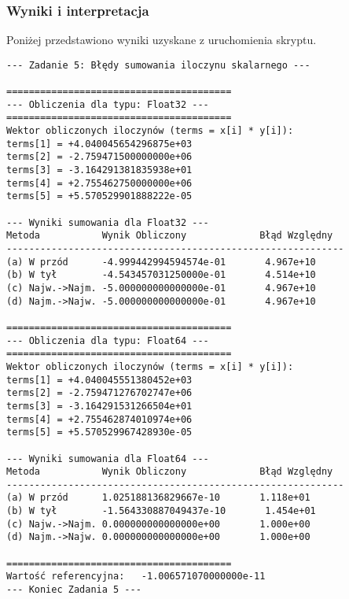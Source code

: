 \documentclass[11pt, a4paper]{article}
\begin{document}
\subsubsection{Wyniki i interpretacja}
Poniżej przedstawiono wyniki uzyskane z uruchomienia skryptu.
\begin{verbatim}
--- Zadanie 5: Błędy sumowania iloczynu skalarnego ---

========================================
--- Obliczenia dla typu: Float32 ---
========================================
Wektor obliczonych iloczynów (terms = x[i] * y[i]):
terms[1] = +4.040045654296875e+03
terms[2] = -2.759471500000000e+06
terms[3] = -3.164291381835938e+01
terms[4] = +2.755462750000000e+06
terms[5] = +5.570529901888222e-05

--- Wyniki sumowania dla Float32 ---
Metoda           Wynik Obliczony             Błąd Względny
------------------------------------------------------------
(a) W przód      -4.999442994594574e-01       4.967e+10
(b) W tył        -4.543457031250000e-01       4.514e+10
(c) Najw.->Najm. -5.000000000000000e-01       4.967e+10
(d) Najm.->Najw. -5.000000000000000e-01       4.967e+10

========================================
--- Obliczenia dla typu: Float64 ---
========================================
Wektor obliczonych iloczynów (terms = x[i] * y[i]):
terms[1] = +4.040045551380452e+03
terms[2] = -2.759471276702747e+06
terms[3] = -3.164291531266504e+01
terms[4] = +2.755462874010974e+06
terms[5] = +5.570529967428930e-05

--- Wyniki sumowania dla Float64 ---
Metoda           Wynik Obliczony             Błąd Względny
------------------------------------------------------------
(a) W przód      1.025188136829667e-10       1.118e+01
(b) W tył        -1.564330887049437e-10       1.454e+01
(c) Najw.->Najm. 0.000000000000000e+00       1.000e+00
(d) Najm.->Najw. 0.000000000000000e+00       1.000e+00

========================================
Wartość referencyjna:   -1.006571070000000e-11
--- Koniec Zadania 5 ---
\end{verbatim}
\end{document}
